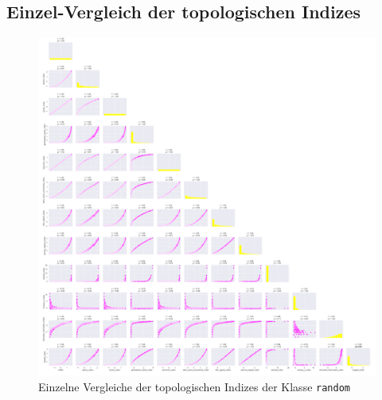 \newpage
\subsection{Einzel-Vergleich der topologischen Indizes} \label{sec:correlation-pairs}

\begin{figure}[H]
    \centering
    \includegraphics[width=1.2\textwidth]{images/30_results/random-correlation-pairs.png}
    \caption{Einzelne Vergleiche der topologischen Indizes der Klasse \texttt{random}}
    \label{fig:correlation-pairs-random}
\end{figure}

